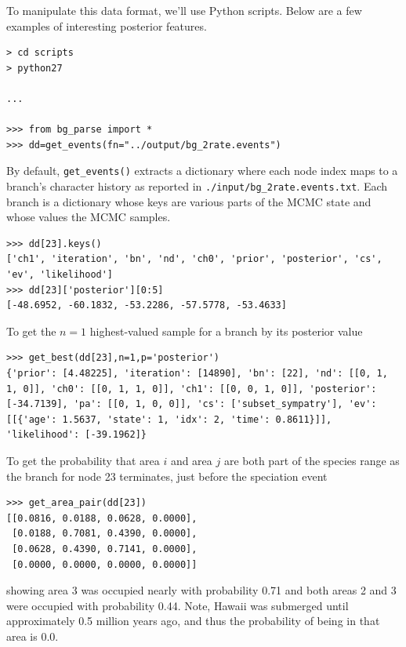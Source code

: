 To manipulate this data format, we'll use Python scripts. Below are a few examples of interesting posterior features.


\begin{snugshade}
\begin{lstlisting}
> cd scripts
> python27

...

>>> from bg_parse import *
>>> dd=get_events(fn="../output/bg_2rate.events")
\end{lstlisting}
\end{snugshade}

By default, {\tt get\_events()} extracts a dictionary where each node index maps to a branch's character history as reported in {\tt ./input/bg\_2rate.events.txt}. 
Each branch is a dictionary whose keys are various parts of the MCMC state and whose values the MCMC samples.
\begin{snugshade}
\begin{lstlisting}
>>> dd[23].keys()
['ch1', 'iteration', 'bn', 'nd', 'ch0', 'prior', 'posterior', 'cs', 'ev', 'likelihood']
>>> dd[23]['posterior'][0:5]
[-48.6952, -60.1832, -53.2286, -57.5778, -53.4633]
\end{lstlisting}
\end{snugshade}

To get the $n=1$ highest-valued sample for a branch by its posterior value
\begin{snugshade}
\begin{lstlisting}
>>> get_best(dd[23],n=1,p='posterior')
{'prior': [4.48225], 'iteration': [14890], 'bn': [22], 'nd': [[0, 1, 1, 0]], 'ch0': [[0, 1, 1, 0]], 'ch1': [[0, 0, 1, 0]], 'posterior': [-34.7139], 'pa': [[0, 1, 0, 0]], 'cs': ['subset_sympatry'], 'ev': [[{'age': 1.5637, 'state': 1, 'idx': 2, 'time': 0.8611}]], 'likelihood': [-39.1962]}
\end{lstlisting}
\end{snugshade}

To get the probability that area $i$ and area $j$ are both part of the species range as the branch for node 23 terminates, just before the speciation event
\begin{snugshade}
\begin{lstlisting}
>>> get_area_pair(dd[23])
[[0.0816, 0.0188, 0.0628, 0.0000],
 [0.0188, 0.7081, 0.4390, 0.0000],
 [0.0628, 0.4390, 0.7141, 0.0000],
 [0.0000, 0.0000, 0.0000, 0.0000]]
\end{lstlisting}
\end{snugshade}
showing area 3 was occupied nearly with probability 0.71 and both areas 2 and 3 were occupied with probability 0.44.
Note, Hawaii was submerged until approximately 0.5 million years ago, and thus the probability of being in that area is 0.0.

